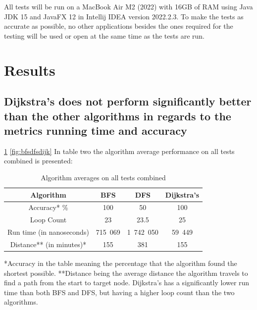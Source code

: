 \documentclass{csfourzero}
\begin{document}
All tests will be run on a MacBook Air M2 (2022) with 16GB of RAM using Java JDK 15 and JavaFX 12 in Intellij IDEA version 2022.2.3. To make the tests as accurate as possible, no other applications besides the ones required for the testing will be used or open at the same time as the tests are run. 


\section{Results}
\label{sec:results}
\vspace{0.5cm} 

\subsection{Dijkstra's does not perform significantly better than the other algorithms in regards to the metrics running time and accuracy}
\ref{tab:algorithmavg}
\ref{fig:bfsdfsdijk}
In table two the algorithm average performance on all tests combined is presented: 
\begin{table}[h]
\centering
\caption{Algorithm averages on all tests combined}
\begin{tabular}{ |c|c|c|c| }  
 \hline 
 Algorithm & BFS & DFS & Dijkstra's  \\ 
 \hline
Accuracy* \% & 100 & 50 & 100\\ 
  \hline
  Loop Count & 23 & 23.5 & 25 \\ 
 \hline
 Run time (in nanoseconds) & 715 069 & 1 742 050 &  59 449\\ 
 \hline
 Distance** (in minutes)* & 155 & 381 & 155 \\ 
 \hline
\end{tabular}
\label{tab:algorithmavg}
\end{table}
 *Accuracy in the table meaning the percentage that the algorithm found the shortest possible. **Distance being the average distance the algorithm travels to find a path from the start to target node. Dijkstra's has a significantly lower run time than both BFS and DFS, but having a higher loop count than the two algorithms.  
\end{document}
